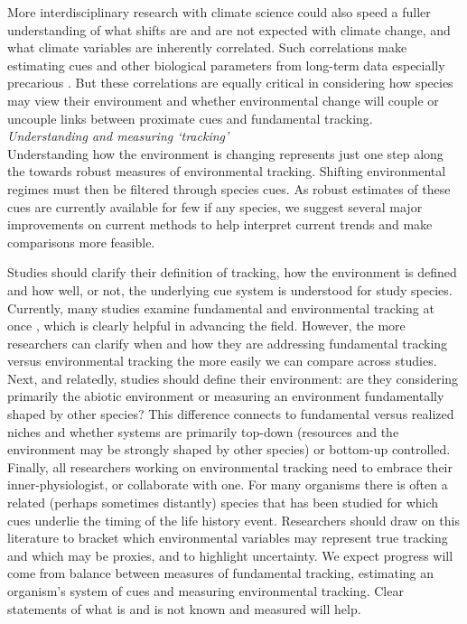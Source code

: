 \documentclass[11pt,letterpaper]{article}
\begin{document}
More interdisciplinary research with climate science could also speed a fuller understanding of what shifts are and are not expected with climate change, and what climate variables are inherently correlated. Such correlations make estimating cues and other biological parameters from long-term data especially precarious \citep{tansey2017}. But these correlations are equally critical in considering how species may view their environment and whether environmental change will couple or uncouple links between proximate cues and fundamental tracking. \\

\emph{Understanding and measuring `tracking'} \\
Understanding how the environment is changing represents just one step along the towards robust measures of environmental tracking. Shifting environmental regimes must then be filtered through species cues. As robust estimates of these cues are currently available for few if any species, we suggest several major improvements on current methods to help interpret current trends and make comparisons more feasible. 

Studies should clarify their definition of tracking, how the environment is defined and how well, or not, the underlying cue system is understood for study species. Currently, many studies examine fundamental and environmental tracking at once \citep[e.g.,][]{yang2020}, which is clearly helpful in advancing the field. However, the more researchers can clarify when and how they are addressing fundamental tracking versus environmental tracking the more easily we can compare across studies. Next, and relatedly, studies should define their environment: are they considering primarily the abiotic environment or measuring an environment fundamentally shaped by other species? This difference connects to fundamental versus realized niches and  whether systems are primarily top-down (resources and the environment may be strongly shaped by other species) or bottom-up controlled. Finally, all researchers working on environmental tracking need to embrace their inner-physiologist, or collaborate with one. For many organisms there is often a related (perhaps sometimes distantly) species that has been studied for which cues underlie the timing of the life history event. Researchers should draw on this literature to bracket which environmental variables may represent true tracking and which may be proxies, and to highlight uncertainty. We expect progress will come from balance between measures of fundamental tracking, estimating an organism's system of cues and measuring environmental tracking. Clear statements of what is and is not known and measured will help. 
\end{document}
